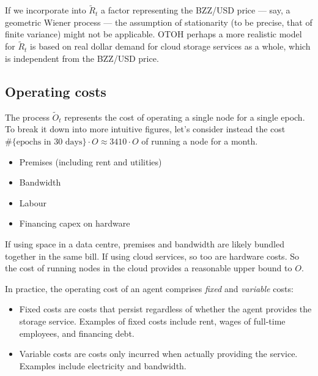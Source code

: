 \begin{remark}

  If we incorporate into $\tilde R_t$ a factor representing the BZZ/USD price --- say, a geometric Wiener process --- the assumption of stationarity (to be precise, that of finite variance) might not be applicable.
  OTOH perhaps a more realistic model for $\tilde R_t$ is based on real dollar demand for cloud storage services as a whole, which is independent from the BZZ/USD price.

\end{remark}


\subsection{Operating costs}
\label{section:cost}

The process $\tilde{O}_t$ represents the cost of operating a single node for a single epoch.
%
To break it down into more intuitive figures, let's consider instead the cost $\#\{\text{epochs in 30 days}\}\cdot O\approx 3410\cdot O$ of running a node for a month.

\begin{itemize}
  \item Premises (including rent and utilities)
  \item Bandwidth
  \item Labour
  \item Financing capex on hardware
\end{itemize}
If using space in a data centre, premises and bandwidth are likely bundled together in the same bill.
%
If using cloud services, so too are hardware costs.
%
So the cost of running nodes in the cloud provides a reasonable upper bound to $O$.

In practice, the operating cost of an agent comprises \emph{fixed} and \emph{variable} costs:
\begin{itemize}
  \item 
    Fixed costs are costs that persist regardless of whether the agent provides the storage service.
    Examples of fixed costs include rent, wages of full-time employees, and financing debt.

  \item
    Variable costs are costs only incurred when actually providing the service.
    Examples include electricity and bandwidth.
\end{itemize}

